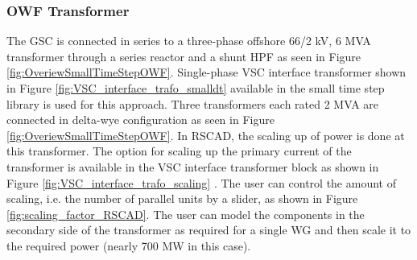 \subsubsection{OWF Transformer}\label{scaling_OWF}
The \gls{GSC} is connected in series to a three-phase offshore 66/2 kV, 6 MVA transformer through a series reactor and a shunt \gls{HPF} as seen in Figure \ref{fig:OveriewSmallTimeStepOWF}. Single-phase \gls{VSC} interface transformer shown in Figure \ref{fig:VSC_interface_trafo_smalldt} available in the small time step library is used for this approach. Three transformers each rated 2 MVA are connected in delta-wye configuration as seen in Figure \ref{fig:OveriewSmallTimeStepOWF}. In RSCAD, the scaling up of power is done at this transformer. The option for scaling up the primary current of the transformer is available in the \gls{VSC} interface transformer block as shown in Figure \ref{fig:VSC_interface_trafo_scaling} \cite{rtds_tech}. The user can control the amount of scaling, i.e. the number of parallel units by a slider, as shown in Figure \ref{fig:scaling_factor_RSCAD}. The user can model the components in the secondary side of the transformer as required for a single \gls{WG} and then scale it to the required power (nearly 700 MW in this case).

